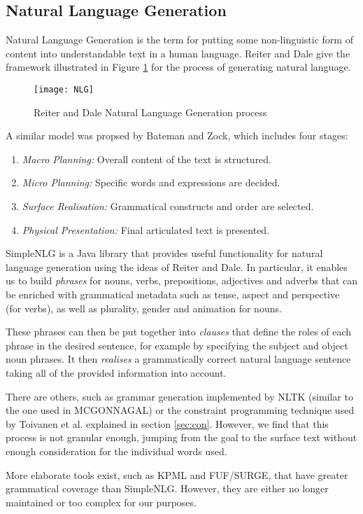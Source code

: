 \subsection{Natural Language Generation}
\label{sec:bg-nlg}
Natural Language Generation is the term for putting some non-linguistic form of content into understandable text in a human language. Reiter and Dale give the framework\cite{reiter2000building} illustrated in Figure \ref{fig:nlg} for the process of generating natural language.

\begin{figure}[h!]
\centering
\texttt{[image: NLG]}
\caption{Reiter and Dale Natural Language Generation process}
\label{fig:nlg}
\end{figure}

A similar model was propsed by Bateman and Zock\cite{mitkov2003oxford}, which includes four stages:
\begin{enumerate}
\item{\textit{Macro Planning:} Overall content of the text is structured.}
\item{\textit{Micro Planning:} Specific words and expressions are decided.}
\item{\textit{Surface Realisation:} Grammatical constructs and order are selected.}
\item{\textit{Physical Presentation:} Final articulated text is presented.}
\end{enumerate}

SimpleNLG\cite{gatt2009simplenlg} is a Java library that provides useful functionality for natural language generation using the ideas of Reiter and Dale. In particular, it enables us to build \textit{phrases} for nouns, verbs, prepositions, adjectives and adverbs that can be enriched with grammatical metadata such as tense, aspect and perspective (for verbs), as well as plurality, gender and animation for nouns.

These phrases can then be put together into \textit{clauses} that define the roles of each phrase in the desired sentence, for example by specifying the subject and object noun phrases. It then \textit{realises} a grammatically correct natural language sentence taking all of the provided information into account.

There are others, such as grammar generation implemented by NLTK (similar to the one used in MCGONNAGAL) or the constraint programming technique used by Toivanen et al. explained in section \ref{sec:con}. However, we find that this process is not granular enough, jumping from the goal to the surface text without enough consideration for the individual words used.

More elaborate tools exist, such as KPML\cite{bateman1997enabling} and FUF\cite{elhadad1989fuf}/SURGE\cite{elhadad1996overview}, that have greater grammatical coverage than SimpleNLG. However, they are either no longer maintained or too complex for our purposes.




